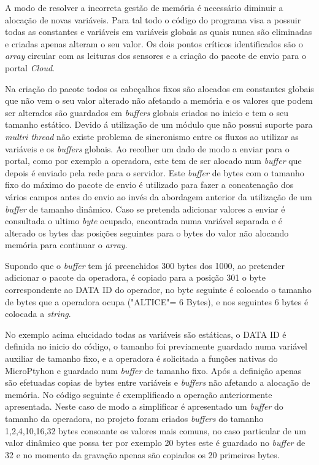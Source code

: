 \par A modo de resolver a incorreta gestão de memória é necessário diminuir a alocação de novas variáveis. Para tal todo o código do programa visa a possuir todas as constantes e variáveis em variáveis globais as quais nunca são eliminadas e criadas apenas alteram o seu valor. Os dois pontos críticos identificados são o \textit{array } circular com as leituras dos sensores e a criação do pacote de envio para o portal \textit{Cloud}.
\par Na criação do pacote todos os cabeçalhos fixos são alocados em constantes globais que não vem o seu valor alterado não afetando a memória e os valores que podem ser alterados são guardados em \textit{buffers} globais criados no inicio e tem o seu tamanho estático. Devido á utilização de um módulo que não possui suporte para \textit{multri thread} não existe problema de sincronismo entre os fluxos ao utilizar as variáveis e os \textit{buffers} globais. Ao recolher um dado de modo a enviar para o portal, como por exemplo a operadora, este tem de ser alocado num \textit{buffer} que depois é enviado pela rede para o servidor. Este \textit{buffer} de bytes com o tamanho fixo do máximo do pacote de envio é utilizado para fazer a concatenação dos vários campos antes do envio ao invés da abordagem anterior da utilização de um \textit{buffer} de tamanho dinâmico. Caso se pretenda adicionar valores a enviar é consultada o ultimo \textit{byte} ocupado, encontrada numa variável separada e é alterado os bytes das posições seguintes para o bytes do valor não alocando memória para continuar o \textit{array}.
\par Supondo que o \textit{buffer} tem já preenchidos 300 bytes dos 1000, ao pretender adicionar o pacote da operadora, é copiado para a posição 301 o byte correspondente ao DATA ID do operador, no byte seguinte é colocado o tamanho de bytes que a operadora ocupa ("ALTICE"= 6 Bytes), e nos seguintes 6 bytes é colocada a \textit{string}.
\par No exemplo acima elucidado todas as variáveis são estáticas, o DATA ID é definida no inicio do código, o tamanho foi previamente guardado numa variável auxiliar de tamanho fixo, e a operadora é solicitada a funções nativas do MicroPtyhon e guardado num \textit{buffer} de tamanho fixo. Após a definição apenas são efetuadas copias de bytes entre variáveis e \textit{buffers} não afetando a alocação de memória. No código seguinte é exemplificado a operação anteriormente apresentada. Neste caso de modo a simplificar é apresentado um \textit{buffer} do tamanho da operadora, no projeto foram criados \textit{buffers} do tamanho 1,2,4,10,16,32 bytes consoante os valores mais comuns, no caso particular de um valor dinâmico que possa ter por exemplo 20 bytes este é guardado no \textit{buffer} de 32 e no momento da gravação apenas são copiados os 20 primeiros bytes.

